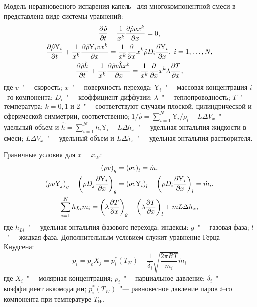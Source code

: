 Модель неравновесного испарения капель~\cite{Dushin.Mathematical.2008} для многокомпонентной  смеси в представлена виде системы уравнений:
\begin{gather}
\frac{\partial\hat{\rho}}{\partial t}+\frac{1}{x^{k}}\frac{\partial\hat{\rho}vx^{k}}{\partial x}=0, \\
\frac{\partial\hat{\rho}\mathrm{Y}_{i}}{\partial t}+\frac{1}{x^{k}}\frac{\partial\hat{\rho}\mathrm{Y}_{i}vx^{k}}{\partial x}=\frac{1}{x^{k}}\frac{\partial}{\partial x}x^{k}\hat{\rho}D_i\frac{\partial \mathrm{Y}_{i}}{\partial x},\; i=1, \ldots, N, \notag \\
\frac{\partial\hat{\rho}\hat{h}}{\partial t}+\frac{1}{x^{k}}\frac{\partial\hat{\rho}v\hat{h}x^{k}}{\partial x}=\frac{1}{x^{k}}\frac{\partial}{\partial x}x^{k}\lambda\frac{\partial T}{\partial x},
\end{gather}
где \(v\)~"--- скорость; \(x\)~"--- поверхность перехода; \(\mathrm{Y}_{i}\)~"--- массовая концентрация \(i\)--го компонента; \(D_{i}\)~"--- коэффициент
диффузии; \(\lambda\)~"--- теплопроводность; \(T\)~"--- температура; \(k=0, 1\) и \(2\)~"--- соответствуют случаям плоской, цилиндрической и сферической симметрии, соответственно; \(\displaystyle 1/\hat{\rho}=\sum_{i=1}^{N}\mathrm{Y}_{i}/\rho_{i}+L\Delta V_{x}\)~"--- удельный объем и \(\displaystyle \hat{h}=\sum_{i=1}^{N}h_{i}\mathrm{Y}_{i}+L\Delta h_{x}\)~"--- удельная энтальпия
жидкости в смеси; \(L\Delta V_{x}\)~"--- удельный объем и \(L\Delta h_{x}\)~"--- удельная энтальпия растворителя.

Граничные условия для \(x=x_{W}\):
\begin{gather}
\left(\rho v\right)_{g}=\left(\rho v\right)_{l}=\dot{m}, \notag \\ 
\left(\rho v\mathrm{Y}_{j}\right)_{g}-\left(\rho D_{j}\frac{\partial \mathrm{Y}_{i}}{\partial x}\right)_{g}=\left(\rho v\mathrm{Y}_{i}\right)_{l}-\left(\rho D_{i}\frac{\partial \mathrm{Y}_{i}}{\partial x}\right)_{l}=\dot{m}_{i}, \\
\sum_{i=1}^{N}h_{Li}\dot{m}_{i}=\left(\lambda\frac{\partial T}{\partial x}\right)_{g}+\left(\lambda\frac{\partial T}{\partial x}\right)_{l}+\dot{m}L\Delta h_{x}, \notag
\end{gather}
где \(h_{Li}\)~"--- удельная энтальпия фазового перехода; индексы: \(g\)~"--- газовая фаза; \(l\)~"--- жидкая фаза.
 Дополнительным условием служит уравнение Герца---Кнудсена:
\begin{equation}
p_{i}=p_{e}X_{j}=p_{i}^{*}\left(T_{W}\right)-\displaystyle \frac{1}{\delta_{i}}\sqrt{\frac{2\pi RT}{m_{i}}}\dot{m}_{i}
\end{equation} 
где \(X_{i}\)~"--- молярная концентрация; \(p_{i}\)~"--- парциальное давление; \(\delta_{i}\)~"--- коэффициент аккомодации; \(p_{i}^{*}(T_{W})\)~"---  равновесное давление паров \(i\)--го компонента при температуре \(T_{W}\).
